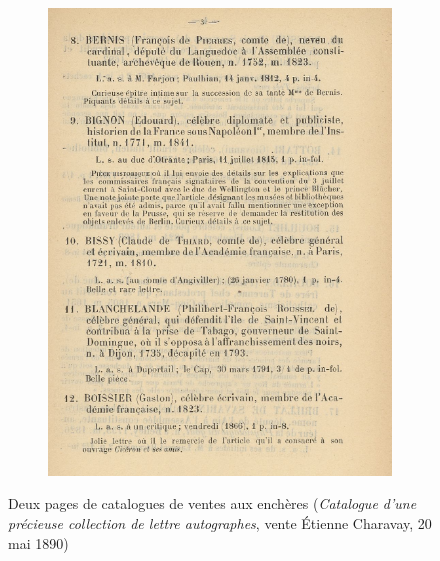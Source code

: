 \begin{figure}[h]
\begin{subfigure}{0.49\textwidth}
		\includegraphics[width=\textwidth]{img/CAT_000441_1.png}
	\end{subfigure}
	\caption{Deux pages de catalogues de ventes aux enchères (\textit{Catalogue d'une précieuse collection de lettre autographes}, vente Étienne Charavay, 20 mai 1890)}
	\label{fig:catpage}
\end{figure}

